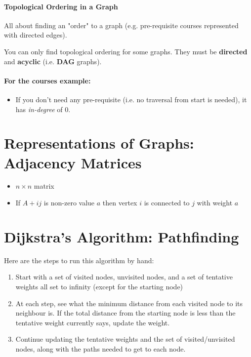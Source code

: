 \documentclass[a4paper,12pt]{report}
\begin{document}
\paragraph{Topological Ordering in a Graph}
All about finding an "order" to a graph (e.g. pre-requisite courses represented with directed edges).

You can only find topological ordering for some graphs. They must be \textbf{directed} and \textbf{acyclic} (i.e. \textbf{DAG} graphs).

\paragraph{For the courses example:}
\begin{itemize}
\item If you don't need any pre-requisite (i.e. no traversal from start is needed), it has \textit{in-degree} of 0.
\end{itemize}

\section{Representations of Graphs: Adjacency Matrices}
\begin{itemize}
\item $n \times n$ matrix
\item If $A+{ij}$ is non-zero value $a$ then vertex $i$ is connected to $j$ with weight $a$
\end{itemize}

\section{Dijkstra's Algorithm: Pathfinding}
Here are the steps to run this algorithm by hand:
\begin{enumerate}
\item Start with a set of visited nodes, unvisited nodes, and a set of tentative weights all set to infinity (except for the starting node)
\item At each step, see what the minimum distance from each visited node to its neighbour is. If the total distance from the starting node is less than the tentative weight currently says, update the weight.
\item Continue updating the tentative weights and the set of visited/unvisited nodes, along with the paths needed to get to each node.
\end{enumerate}
\end{document}
